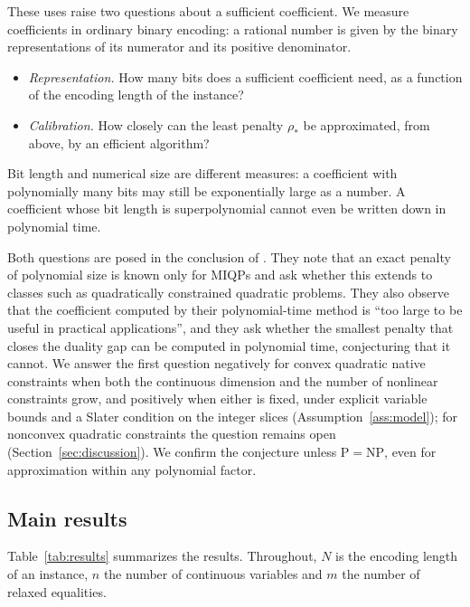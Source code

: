 These uses raise two questions about a sufficient coefficient. We
measure coefficients in ordinary binary encoding: a rational number is
given by the binary representations of its numerator and its positive
denominator.
\begin{itemize}
\item \emph{Representation.} How many bits does a sufficient coefficient
 need, as a function of the encoding length of the instance?
\item \emph{Calibration.} How closely can the least penalty $\rho_*$ be
 approximated, from above, by an efficient algorithm?
\end{itemize}
Bit length and numerical size are different measures: a coefficient with
polynomially many bits may still be exponentially large as a number. A
coefficient whose bit length is superpolynomial cannot even be written
down in polynomial time.

Both questions are posed in the conclusion of
\citet{LefebvreSchmidt2025}. They note that an exact penalty of
polynomial size is known only for MIQPs and ask whether this extends to
classes such as quadratically constrained quadratic problems. They also
observe that the coefficient computed by their polynomial-time method is
``too large to be useful in practical applications'', and they ask
whether the smallest penalty that closes the duality gap can be computed
in polynomial time, conjecturing that it cannot. We answer the first
question negatively for convex quadratic native constraints when both
the continuous dimension and the number of nonlinear constraints grow,
and positively when either is fixed, under explicit variable bounds and
a Slater condition on the integer slices (Assumption~\ref{ass:model});
for nonconvex quadratic constraints the question remains open
(Section~\ref{sec:discussion}). We confirm the conjecture unless
$\mathrm P=\mathrm{NP}$, even for approximation within any polynomial
factor.

\subsection{Main results}
Table~\ref{tab:results} summarizes the results. Throughout, $N$ is the
encoding length of an instance, $n$ the number of continuous variables
and $m$ the number of relaxed equalities.

